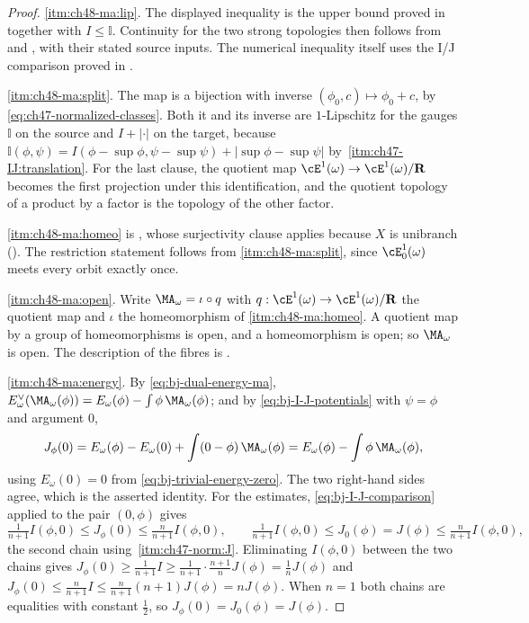 \begin{proof}
\cref{itm:ch48-ma:lip}.  The displayed inequality is the upper bound proved
in  together with
$I\le\mathbb I$.  Continuity for the two strong topologies then follows
from  and
, with their stated source inputs.
The numerical inequality itself uses the I/J comparison proved in
.

\cref{itm:ch48-ma:split}.  The map is a bijection with inverse
$(\phi_0,c)\mapsto\phi_0+c$, by
\eqref{eq:ch47-normalized-classes}.  Both it and its inverse are
$1$-Lipschitz for the gauges $\mathbb I$ on the source and
$I+|\cdot|$ on the target, because
$\mathbb I(\phi,\psi)=I(\phi-\sup\phi,\psi-\sup\psi)
+|\sup\phi-\sup\psi|$ by
\,\cref{itm:ch47-IJ:translation}.  For the last
clause, the quotient map $\cE^1(\omega)\to\cE^1(\omega)/\mathbf R$
becomes the first projection under this identification, and the quotient
topology of a product by a factor is the topology of the other factor.

\cref{itm:ch48-ma:homeo} is , whose
surjectivity clause applies because $X$ is unibranch
().  The restriction statement follows from
\cref{itm:ch48-ma:split}, since $\cE^1_0(\omega)$ meets every orbit
exactly once.

\cref{itm:ch48-ma:open}.  Write $\MA_\omega=\iota\circ q$ with
$q:\cE^1(\omega)\to\cE^1(\omega)/\mathbf R$ the quotient map and
$\iota$ the homeomorphism of \cref{itm:ch48-ma:homeo}.  A quotient map by
a group of homeomorphisms is open, and a homeomorphism is open; so
$\MA_\omega$ is open.  The description of the fibres is
.

\cref{itm:ch48-ma:energy}.  By \eqref{eq:bj-dual-energy-ma},
$E^\vee_\omega(\MA_\omega(\phi))=E_\omega(\phi)
-\int\phi\,\MA_\omega(\phi)$; and by
\eqref{eq:bj-I-J-potentials} with $\psi=\phi$ and argument $0$,
\[
 J_\phi(0)=E_\omega(\phi)-E_\omega(0)+\int(0-\phi)\,\MA_\omega(\phi)
 =E_\omega(\phi)-\int\phi\,\MA_\omega(\phi),
\]
using $E_\omega(0)=0$ from \eqref{eq:bj-trivial-energy-zero}.  The two
right-hand sides agree, which is the asserted identity.  For the
estimates, \eqref{eq:bj-I-J-comparison} applied to the pair
$(0,\phi)$ gives
\[
 \tfrac1{n+1}I(\phi,0)\le J_\phi(0)\le\tfrac n{n+1}I(\phi,0),
 \qquad
 \tfrac1{n+1}I(\phi,0)\le J_0(\phi)=J(\phi)\le\tfrac n{n+1}I(\phi,0),
\]
the second chain using
\,\cref{itm:ch47-norm:J}.  Eliminating
$I(\phi,0)$ between the two chains gives
$J_\phi(0)\ge\frac1{n+1}I\ge\frac1{n+1}\cdot\frac{n+1}nJ(\phi)
=\frac1nJ(\phi)$ and
$J_\phi(0)\le\frac n{n+1}I\le\frac n{n+1}(n+1)J(\phi)=nJ(\phi)$.  When
$n=1$ both chains are equalities with constant $\tfrac12$, so
$J_\phi(0)=J_0(\phi)=J(\phi)$.
\end{proof}

